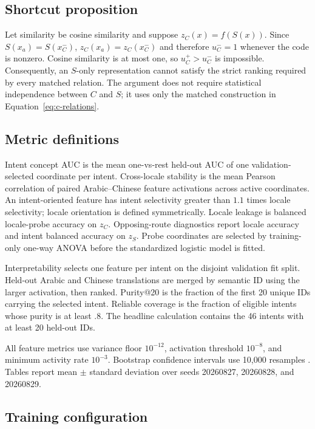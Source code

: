 \subsection{Shortcut proposition}
\label{app:shortcut-proof}

Let similarity be cosine similarity and suppose $z_C(x)=f(S(x))$. Since $S(x_a)=S(x_C^-)$, $z_C(x_a)=z_C(x_C^-)$ and therefore $u_C^-=1$ whenever the code is nonzero. Cosine similarity is at most one, so $u_C^+>u_C^-$ is impossible. Consequently, an $S$-only representation cannot satisfy the strict ranking required by every matched relation. The argument does not require statistical independence between $C$ and $S$; it uses only the matched construction in Equation~\ref{eq:c-relations}.

\subsection{Metric definitions}

Intent concept AUC is the mean one-vs-rest held-out AUC of one validation-selected coordinate per intent. Cross-locale stability is the mean Pearson correlation of paired Arabic--Chinese feature activations across active coordinates. An intent-oriented feature has intent selectivity greater than $1.1$ times locale selectivity; locale orientation is defined symmetrically. Locale leakage is balanced locale-probe accuracy on $z_C$. Opposing-route diagnostics report locale accuracy and intent balanced accuracy \citep{brodersen2010balanced} on $z_S$. Probe coordinates are selected by training-only one-way ANOVA \citep{fisher1925statistical} before the standardized logistic model is fitted.

Interpretability selects one feature per intent on the disjoint validation fit split. Held-out Arabic and Chinese translations are merged by semantic ID using the larger activation, then ranked. Purity@20 is the fraction of the first 20 unique IDs carrying the selected intent. Reliable coverage is the fraction of eligible intents whose purity is at least .8. The headline calculation contains the 46 intents with at least 20 held-out IDs.

All feature metrics use variance floor $10^{-12}$, activation threshold $10^{-8}$, and minimum activity rate $10^{-3}$. Bootstrap confidence intervals use 10,000 resamples \citep{efron1993bootstrap}. Tables report mean $\pm$ standard deviation over seeds 20260827, 20260828, and 20260829.

\subsection{Training configuration}

